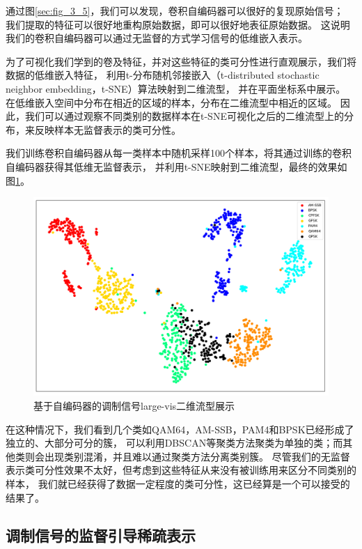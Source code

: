 通过图\ref{sec:fig_3_5}，我们可以发现，卷积自编码器可以很好的复现原始信号；
我们提取的特征可以很好地重构原始数据，即可以很好地表征原始数据。
这说明我们的卷积自编码器可以通过无监督的方式学习信号的低维嵌入表示。\par

为了可视化我们学到的卷及特征，并对这些特征的类可分性进行直观展示，我们将数据的低维嵌入特征，
利用t-分布随机邻接嵌入（t-distributed stochastic neighbor embedding，t-SNE）算法映射到二维流型，
并在平面坐标系中展示。
在低维嵌入空间中分布在相近的区域的样本，分布在二维流型中相近的区域。
因此，我们可以通过观察不同类别的数据样本在t-SNE可视化之后的二维流型上的分布，来反映样本无监督表示的类可分性。\par

我们训练卷积自编码器从每一类样本中随机采样100个样本，将其通过训练的卷积自编码器获得其低维无监督表示，
并利用t-SNE映射到二维流型，最终的效果如图\ref{sec:fig_3_6}。

\begin{figure}[!h]
	\centering
	\includegraphics[scale=0.4]{figures/chapter_3/fig_3_6}
	\caption{基于自编码器的调制信号large-vis二维流型展示}	\label{sec:fig_3_6}
\end{figure}

在这种情况下，我们看到几个类如QAM64，AM-SSB，PAM4和BPSK已经形成了独立的、大部分可分的簇，
可以利用DBSCAN等聚类方法聚类为单独的类；而其他类则会出现类别混淆，并且难以通过聚类方法分离类别簇。 
尽管我们的无监督表示类可分性效果不太好，但考虑到这些特征从来没有被训练用来区分不同类别的样本，
我们就已经获得了数据一定程度的类可分性，这已经算是一个可以接受的结果了。 \par 

\subsection{调制信号的监督引导稀疏表示}

